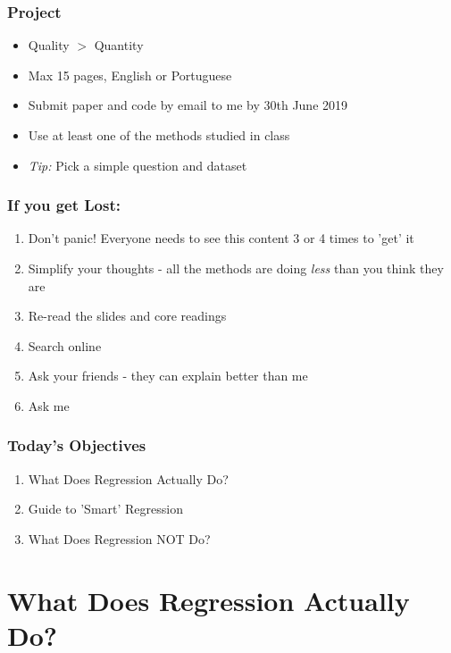\documentclass[xcolor=x11names,compress]{beamer}\usepackage[]{graphicx}\usepackage[]{color}
\renewcommand{\(}{\begin{columns}}
\renewcommand{\)}{\end{columns}}
\newcommand{\<}[1]{\begin{column}{#1}}
\renewcommand{\>}{\end{column}}
\begin{document}
\begin{frame}
\frametitle{Project}
\begin{itemize}
\item Quality $>$ Quantity
\pause
\item Max 15 pages, English or Portuguese
\pause
\item Submit paper and code by email to me by 30th June 2019
\pause
\item Use at least one of the methods studied in class
\pause
\item \textit{Tip:} Pick a simple question and dataset
\end{itemize}
\end{frame}

\begin{frame}
\frametitle{If you get Lost:}
\begin{enumerate}
\item Don't panic! Everyone needs to see this content 3 or 4 times to 'get' it
\pause
\item Simplify your thoughts - all the methods are doing \textit{less} than you think they are
\pause
\item Re-read the slides and core readings
\pause
\item Search online
\pause
\item Ask your friends - they can explain better than me
\pause
\item Ask me
\end{enumerate}
\end{frame}

\begin{frame}
\frametitle{Today's Objectives}
\begin{enumerate}
\item What Does Regression Actually Do?
\item Guide to 'Smart' Regression
\item What Does Regression NOT Do?
\end{enumerate}
\end{frame}

\section{What Does Regression Actually Do?}
\end{document}
